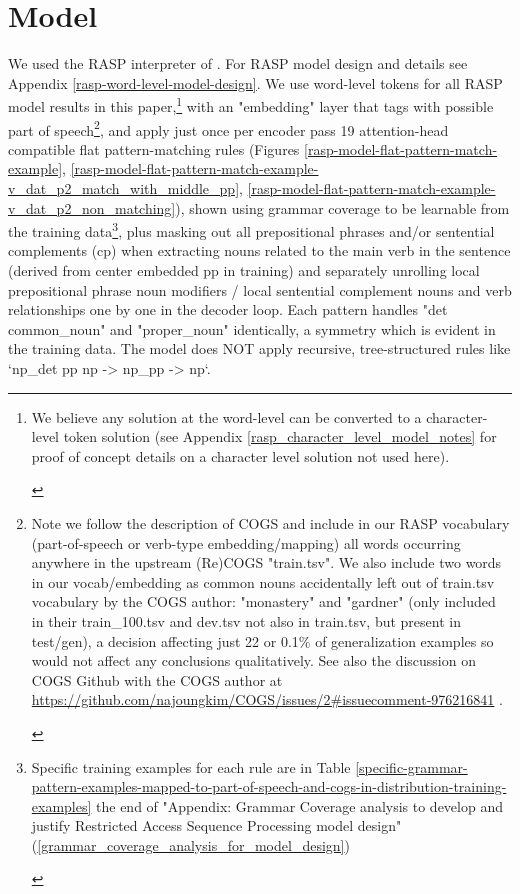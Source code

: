 \documentclass[11pt]{article}
\begin{document}
\section{Model}
\label{model}

We used the RASP interpreter of \cite{Weiss2021}. For RASP model design and details see Appendix \ref{rasp-word-level-model-design}. We use word-level tokens for all RASP model results in this paper,\footnote{\begin{footnotesize}We believe any solution at the word-level can be converted to a character-level token solution (see Appendix \ref{rasp_character_level_model_notes} for proof of concept details on a character level solution not used here).
\end{footnotesize}
}
with an "embedding" layer that tags with possible part of speech\footnote{\begin{footnotesize}Note we follow the \cite{klinger2024compositionalprogramgenerationfewshot} description of COGS and include in our RASP vocabulary (part-of-speech or verb-type embedding/mapping) all words occurring anywhere in the upstream (Re)COGS "train.tsv". We also include two words in our vocab/embedding as common nouns accidentally left out of train.tsv vocabulary by the COGS author: "monastery" and "gardner" (only included in their train\_100.tsv and dev.tsv not also in train.tsv, but present in test/gen), a decision affecting just 22 or 0.1\% of generalization examples so would not affect any conclusions qualitatively. See also the discussion on COGS Github with the COGS author at \href{https://github.com/najoungkim/COGS/issues/2\#issuecomment-976216841}{https://github.com/najoungkim/COGS/issues/2\#issuecomment-976216841} .\end{footnotesize}}, and apply just once per encoder pass 19 attention-head compatible flat pattern-matching rules (Figures \ref{rasp-model-flat-pattern-match-example}, \ref{rasp-model-flat-pattern-match-example-v_dat_p2_match_with_middle_pp}, \ref{rasp-model-flat-pattern-match-example-v_dat_p2_non_matching}), shown using grammar coverage \cite{fuzzingbook2023:GrammarCoverageFuzzer} to be learnable from the training data\footnote{\begin{footnotesize}Specific training examples for each rule are in Table \ref{specific-grammar-pattern-examples-mapped-to-part-of-speech-and-cogs-in-distribution-training-examples} the end of "Appendix: Grammar Coverage analysis to develop and justify Restricted Access Sequence Processing model design" (\ref{grammar_coverage_analysis_for_model_design})\end{footnotesize}}, plus masking out all prepositional phrases and/or sentential complements (cp) when extracting nouns related to the main verb in the sentence (derived from center embedded pp in training) and separately unrolling local prepositional phrase noun modifiers / local sentential complement nouns and verb relationships one by one in the decoder loop. Each pattern handles "det common\_noun" and "proper\_noun" identically, a symmetry which is evident in the training data. The model does NOT apply recursive, tree-structured rules like `np\_det pp np -> np\_pp -> np`.
\end{document}
